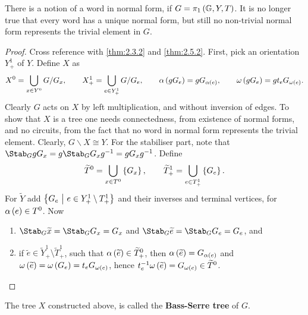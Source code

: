 
\begin{remark*}
There is a notion of a word in normal form, if $ G = \pi_1\br{\GG, Y, T} $. It is no longer true that every word has a unique normal form, but still no non-trivial normal form represents the trivial element in $ G $.
\end{remark*}

\pagebreak

\begin{proof}
Cross reference with \ref{thm:2.3.2} and \ref{thm:2.5.2}. First, pick an orientation $ Y_+^1 $ of $ Y $. Define $ X $ as
$$ X^0 = \bigcup_{x \in Y^0} G / G_x, \qquad X_+^1 = \bigcup_{e \in Y_+^1} G / G_e, \qquad \alpha\br{gG_e} = gG_{\alpha\br{e}}, \qquad \omega\br{gG_e} = gt_eG_{\omega\br{e}}. $$
Clearly $ G $ acts on $ X $ by left multiplication, and without inversion of edges. To show that $ X $ is a tree one needs connectedness, from existence of normal forms, and no circuits, from the fact that no word in normal form represents the trivial element. Clearly, $ G \backslash X \cong Y $. For the stabiliser part, note that $ \Stab_G gG_x = g\Stab_G G_xg^{-1} = gG_xg^{-1} $. Define
$$ \widetilde{T}^0 = \bigcup_{x \in T^0} \cbr{G_x}, \qquad \widetilde{T}_+^1 = \bigcup_{e \in T_+^1} \cbr{G_e}. $$
For $ \widetilde{Y} $ add $ \cbr{G_e \st e \in Y_+^1 \setminus T_+^1} $ and their inverses and terminal vertices, for $ \alpha\br{e} \in T^0 $. Now
\begin{enumerate}
\item $ \Stab_G \widetilde{x} = \Stab_G G_x = G_x $ and $ \Stab_G \widetilde{e} = \Stab_G G_e = G_e $, and
\item if $ \widetilde{e} \in \widetilde{Y}_+^1 \setminus \widetilde{T}_+^1 $, such that $ \alpha\br{\widetilde{e}} \in \widetilde{T}_+^0 $, then $ \alpha\br{\widetilde{e}} = G_{\alpha\br{e}} $ and $ \omega\br{\widetilde{e}} = \omega\br{G_e} = t_eG_{\omega\br{e}} $, hence $ t_e^{-1}\omega\br{\widetilde{e}} = G_{\omega\br{e}} \in \widetilde{T}^0 $.
\end{enumerate}
\end{proof}

\begin{definition}
The tree $ X $ constructed above, is called the \textbf{Bass-Serre tree} of $ G $.
\end{definition}

